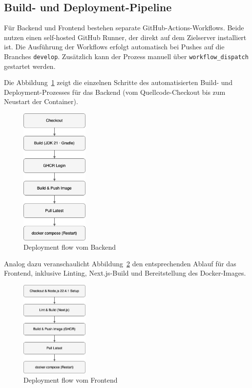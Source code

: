 \documentclass[12pt,a4paper]{report}
\begin{document}
    \subsection{Build- und Deployment-Pipeline}

        Für Backend und Frontend bestehen separate GitHub-Actions-Workflows.
        Beide nutzen einen self-hosted GitHub Runner, der direkt auf dem Zielserver installiert ist.
        Die Ausführung der Workflows erfolgt automatisch bei Pushes auf die Branches \texttt{develop}.
        Zusätzlich kann der Prozess manuell über \texttt{workflow\_dispatch} gestartet werden.

        Die Abbildung~\ref{fig:backend-flow} zeigt die einzelnen Schritte des automatisierten Build- und Deployment-Prozesses für das Backend
        (vom Quellcode-Checkout bis zum Neustart der Container).

        \begin{figure}[H]
          \centering
          \includegraphics[width=0.3\textwidth]{../figures/backend-flow.drawio.png}
          \caption{Deployment flow vom Backend}
          \label{fig:backend-flow}
        \end{figure}


        Analog dazu veranschaulicht Abbildung~\ref{fig:frontend-flow} den entsprechenden Ablauf für das Frontend,
        inklusive Linting, Next.js-Build und Bereitstellung des Docker-Images.

        \begin{figure}[H]
          \centering
          \includegraphics[width=0.3\textwidth]{../figures/frontend-flow.drawio.png}
          \caption{Deployment flow vom Frontend}
          \label{fig:frontend-flow}
        \end{figure}
\end{document}
